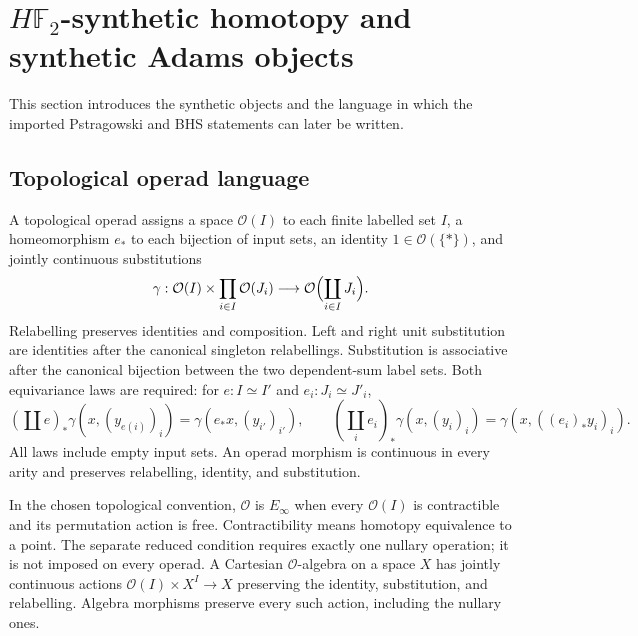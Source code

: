 \section{$H\mathbb F_2$-synthetic homotopy and synthetic Adams objects}
\label{chap:synthetic-foundations}

This section introduces the synthetic objects and the language in which the imported Pstragowski and BHS statements can later be written.

\subsection{Topological operad language}

\begin{definition}
  \label{def:topological-operad-foundation}
  \leanok
  A topological operad assigns a space $\mathcal O(I)$ to each finite
  labelled set $I$, a homeomorphism $e_*$ to each bijection of input sets,
  an identity $1\in\mathcal O(\{*\})$, and jointly continuous substitutions
  \[
    \gamma:\mathcal O(I)\times\prod_{i\in I}\mathcal O(J_i)
       \longrightarrow\mathcal O\Bigl(\coprod_{i\in I}J_i\Bigr).
  \]
  Relabelling preserves identities and composition. Left and right unit
  substitution are identities after the canonical singleton relabellings.
  Substitution is associative after the canonical bijection between the
  two dependent-sum label sets. Both equivariance laws are required: for
  $e:I\simeq I'$ and $e_i:J_i\simeq J'_i$,
  \[
    (\coprod e)_*\gamma(x,(y_{e(i)})_i)
       =\gamma(e_*x,(y_{i'})_{i'}),\qquad
    (\coprod_i e_i)_*\gamma(x,(y_i)_i)
       =\gamma(x,((e_i)_*y_i)_i).
  \]
  All laws include empty input sets. An operad morphism is continuous in
  every arity and preserves relabelling, identity, and substitution.

  In the chosen topological convention, $\mathcal O$ is $E_\infty$ when
  every $\mathcal O(I)$ is contractible and its permutation action is free.
  Contractibility means homotopy equivalence to a point. The separate
  reduced condition requires exactly one nullary operation; it is not
  imposed on every operad. A Cartesian $\mathcal O$-algebra on a space $X$
  has jointly continuous actions $\mathcal O(I)\times X^I\to X$ preserving
  the identity, substitution, and relabelling. Algebra morphisms preserve
  every such action, including the nullary ones.
\end{definition}

